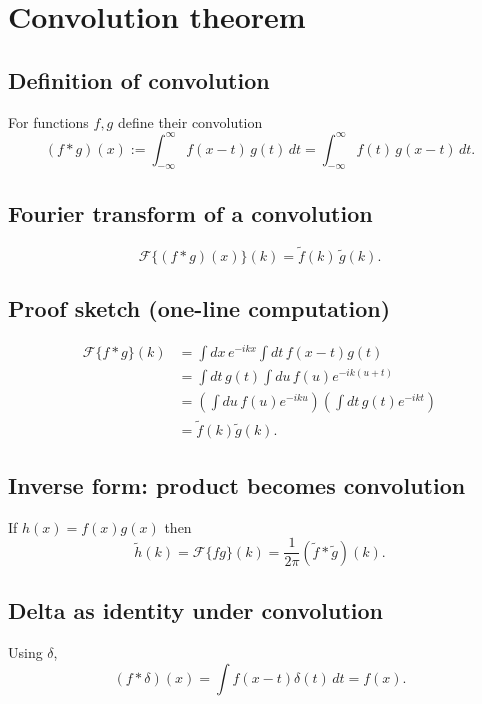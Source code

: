 
\section{Convolution theorem}

\subsection{Definition of convolution}
For functions $f,g$ define their convolution
\begin{equation}
(f*g)(x) := \int_{-\infty}^{\infty} f(x-t)\,g(t)\,dt
= \int_{-\infty}^{\infty} f(t)\,g(x-t)\,dt.
\end{equation}

\subsection{Fourier transform of a convolution}
\begin{equation}
\boxed{\mathcal{F}\{(f*g)(x)\}(k)=\tilde f(k)\,\tilde g(k)}.
\end{equation}

\subsection{Proof sketch (one-line computation)}
\begin{align}
\mathcal{F}\{f*g\}(k)
&= \int dx\,e^{-ikx}\int dt\,f(x-t)g(t)\\
&= \int dt\,g(t)\int du\,f(u)e^{-ik(u+t)}\\
&= \left(\int du\,f(u)e^{-iku}\right)\left(\int dt\,g(t)e^{-ikt}\right)\\
&= \tilde f(k)\tilde g(k).
\end{align}

\subsection{Inverse form: product becomes convolution}
If $h(x)=f(x)g(x)$ then
\begin{equation}
\boxed{\tilde h(k)=\mathcal{F}\{fg\}(k)=\frac{1}{2\pi}(\tilde f * \tilde g)(k)}.
\end{equation}

\subsection{Delta as identity under convolution}
Using $\delta$,
\begin{equation}
(f*\delta)(x)=\int f(x-t)\delta(t)\,dt=f(x).
\end{equation}

